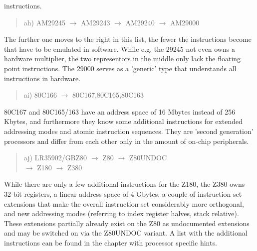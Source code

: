 \documentclass[12pt,twoside]{report}
\begin{document}
instructions.
\begin{quote}
ah) AM29245 $\rightarrow$ AM29243 $\rightarrow$ AM29240 $\rightarrow$ AM29000
\end{quote}
The further one moves to the right in this list, the fewer the
instructions become that have to be emulated in software.  While e.g.
the 29245 not even owns a hardware multiplier, the two representors in
the middle only lack the floating point instructions.  The 29000
serves as a 'generic' type that understands all instructions in
hardware.
\begin{quote}
ai) 80C166 $\rightarrow$ 80C167,80C165,80C163
\end{quote}
80C167 and 80C165/163 have an address space of 16 Mbytes instead of 256
Kbytes, and furthermore they know some additional instructions for
extended addressing modes and atomic instruction sequences.  They are
'second generation' processors and differ from each other only in the
amount of on-chip peripherals.
\begin{quote}
aj) LR35902/GBZ80 $\rightarrow$ Z80 $\rightarrow$ Z80UNDOC \\
    $\rightarrow$ Z180 $\rightarrow$ Z380
\end{quote}
While there are only a few additional instructions for the Z180, the
Z380 owns 32-bit registers, a linear address space of 4 Gbytes, a
couple of instruction set extensions that make the overall
instruction set considerably more orthogonal, and new addressing
modes (referring to index register halves, stack relative).  These
extensions partially already exist on the Z80 as undocumented
extensions and may be switched on via the Z80UNDOC variant.  A list
with the additional instructions can be found in the chapter
with processor specific hints.
\end{document}
